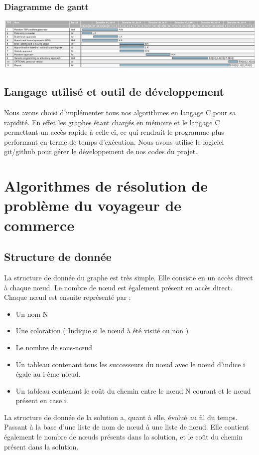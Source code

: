 \documentclass[10pt,a4paper]{report}
\begin{document}
		\subsubsection{Diagramme de gantt}
		
			\includegraphics[scale=0.37]{./Ressource/planning_AA.png}
		
	
	\subsection{Langage utilisé et outil de développement}
	\begin{flushleft}
	Nous avons choisi d'implémenter tous nos algorithmes en langage C  pour sa rapidité. En effet les graphes étant chargés en mémoire et le langage C permettant un accès rapide à celle-ci, ce qui rendrait le programme plus performant en terme de temps d'exécution.
	Nous avons utilisé le logiciel git/github pour gérer le développement de nos codes du projet.
	\end{flushleft}
	
\section{Algorithmes de résolution de problème du voyageur de commerce}

	\subsection{Structure de donnée}
	\begin{flushleft}
	La structure de donnée du graphe est très simple. Elle consiste en un accès direct à chaque nœud. Le nombre de nœud est également présent en accès direct.
	Chaque nœud est ensuite représenté par : 
	\begin{itemize}
		\item Un nom N
		\item Une coloration ( Indique si le nœud à été visité ou non )
		\item Le nombre de sous-nœud
		\item Un tableau contenant tous les successeurs du nœud avec le nœud d'indice i égale au i-ème nœud.
		\item Un tableau contenant le coût du chemin entre le nœud N courant et le nœud présent en case i.
	\end{itemize}
	
	La structure de donnée de la solution a, quant à elle, évolué au fil du temps.
	Passant à la base d'une liste de nom de nœud à une liste de nœud.
	Elle contient également le nombre de nœuds présents dans la solution, et le coût du chemin présent dans la solution.

	\end{flushleft}
	
\end{document}
